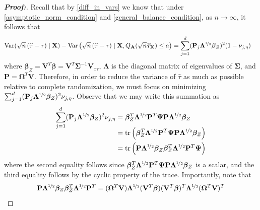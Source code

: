 \documentclass[11pt,twoside]{article}
\theoremstyle{definition}
\theoremstyle{remark}
\begin{document}
\begin{proof}[\textbf{Proof:}]
Recall that by \cref{diff_in_vars} we know that under \cref{asymptotic_norm_condition} and \cref{general_balance_condition}, as $n \to \infty$, it follows that
 \begin{align*}
        \text{Var}(\sqrt{n} \left(\widehat{\tau} - \tau \right) \mid \mathbf{X}) - \text{Var}\left(  \sqrt{n} \left(\widehat{\tau} - \tau \right) \mid \mathbf{X}, Q_{\mathbf{A}}(\sqrt{n} \widehat{\bm{\tau}}_{\mathbf{X}}) \leq a \right)  &= \sum^d_{j=1} (\mathbf{P}_j \mathbf{\Lambda}^{\nicefrac{1}{2}} \bm{\beta}_Z)^2 (1 - \nu_{j, \eta}) 
    \end{align*}
    where $\bm{\beta}_Z = \mathbf{V}^T \bm{\beta} = \mathbf{V}^T \mathbf{\Sigma}^{-1} \mathbf{V}_{x \tau}$, $\mathbf{\Lambda}$ is the diagonal matrix of eigenvalues of $\mathbf{\Sigma}$, and $\mathbf{P} = \mathbf{\Omega}^T \mathbf{V}$. Therefore, in order to reduce the variance of $\widehat{\tau}$ as much as possible relative to complete randomization, we must focus on minimizing $\sum^d_{j=1} (\mathbf{P}_j \mathbf{\Lambda}^{\nicefrac{1}{2}} \bm{\beta}_Z)^2 \nu_{j, \eta}$. Observe that we may write this summation as
    \begin{align*}
        \sum^d_{j=1} (\mathbf{P}_j \mathbf{\Lambda}^{\nicefrac{1}{2}} \bm{\beta}_Z)^2 \nu_{j, \eta} &= \bm{\beta}^T_Z \mathbf{\Lambda}^{\nicefrac{1}{2}} \mathbf{P}^T \mathbf{\Psi} \mathbf{P} \mathbf{\Lambda}^{\nicefrac{1}{2}} \bm{\beta}_Z \\[-0.1in]
        &= \text{tr}\left(\bm{\beta}^T_Z \mathbf{\Lambda}^{\nicefrac{1}{2}} \mathbf{P}^T \mathbf{\Psi} \mathbf{P} \mathbf{\Lambda}^{\nicefrac{1}{2}} \bm{\beta}_Z \right) \\
        &= \text{tr}\left(\mathbf{P} \mathbf{\Lambda}^{\nicefrac{1}{2}} \bm{\beta}_Z \bm{\beta}^T_Z \mathbf{\Lambda}^{\nicefrac{1}{2}} \mathbf{P}^T \mathbf{\Psi}    \right)
    \end{align*}
    where the second equality follows since $\bm{\beta}^T_Z \mathbf{\Lambda}^{\nicefrac{1}{2}} \mathbf{P}^T \mathbf{\Psi} \mathbf{P} \mathbf{\Lambda}^{\nicefrac{1}{2}} \bm{\beta}_Z$ is a scalar, and the third equality follows by the cyclic property of the trace. Importantly, note that 
    \begin{align*}
        \mathbf{P} \mathbf{\Lambda}^{\nicefrac{1}{2}} \bm{\beta}_Z \bm{\beta}^T_Z \mathbf{\Lambda}^{\nicefrac{1}{2}} \mathbf{P}^T &= (\mathbf{\Omega}^T \mathbf{V}) \mathbf{\Lambda}^{\nicefrac{1}{2}} (\mathbf{V}^T \bm{\beta}) (\mathbf{V}^T \bm{\beta})^T \mathbf{\Lambda}^{\nicefrac{1}{2}} (\mathbf{\Omega}^T \mathbf{V})^T \\

\end{align*}
\end{proof}
\end{document}
